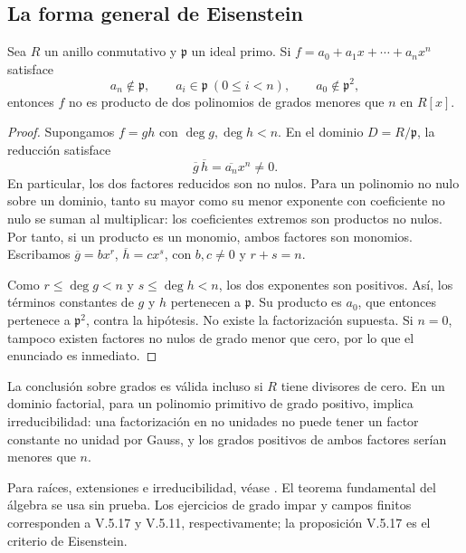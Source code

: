 \subsection{La forma general de Eisenstein}
\begin{prop}\label{prop:C19-Eisenstein}
Sea $R$ un anillo conmutativo y $\mathfrak p$ un ideal primo. Si $f=a_0+a_1x+\cdots+a_nx^n$ satisface
\[
a_n\notin\mathfrak p,\qquad
a_i\in\mathfrak p\ (0\leq i<n),\qquad
a_0\notin\mathfrak p^2,
\]
entonces $f$ no es producto de dos polinomios de grados menores que $n$ en $R[x]$.
\end{prop}
\begin{proof}
Supongamos $f=gh$ con $\deg g,\deg h<n$. En el dominio $D=R/\mathfrak p$, la reducción satisface
\[
\overline g\,\overline h=\overline{a_n}x^n\ne0.
\]
En particular, los dos factores reducidos son no nulos. Para un polinomio no nulo sobre un dominio, tanto su mayor como su menor exponente con coeficiente no nulo se suman al multiplicar: los coeficientes extremos son productos no nulos. Por tanto, si un producto es un monomio, ambos factores son monomios. Escribamos $\overline g=bx^r$, $\overline h=cx^s$, con $b,c\ne0$ y $r+s=n$.

Como $r\leq\deg g<n$ y $s\leq\deg h<n$, los dos exponentes son positivos. Así, los términos constantes de $g$ y $h$ pertenecen a $\mathfrak p$. Su producto es $a_0$, que entonces pertenece a $\mathfrak p^2$, contra la hipótesis. No existe la factorización supuesta. Si $n=0$, tampoco existen factores no nulos de grado menor que cero, por lo que el enunciado es inmediato.
\end{proof}
La conclusión sobre grados es válida incluso si $R$ tiene divisores de cero. En un dominio factorial, para un polinomio primitivo de grado positivo, implica irreducibilidad: una factorización en no unidades no puede tener un factor constante no unidad por Gauss, y los grados positivos de ambos factores serían menores que $n$.

\begin{obs}
Para raíces, extensiones e irreducibilidad, véase \citet[cap.~V, apartados 5.1--4 y resultados 5.1--17]{aluffi2009}. El teorema fundamental del álgebra se usa sin prueba. Los ejercicios de grado impar y campos finitos corresponden a V.5.17 y V.5.11, respectivamente; la proposición V.5.17 es el criterio de Eisenstein.
\end{obs}

